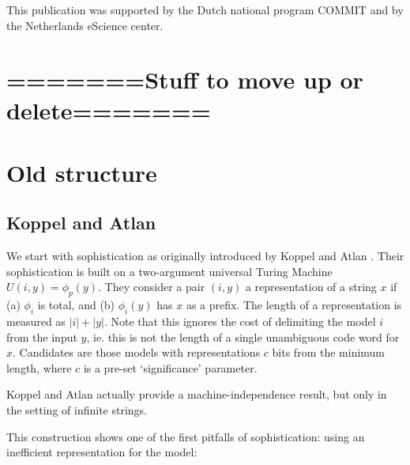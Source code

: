 \documentclass{style/llncs}
\begin{document}
\subsubsection*{\ackname}

This publication was supported by the Dutch national program COMMIT and by  the Netherlands eScience center.




\appendix

\section{=======Stuff to move up or delete=======}

\section{Old structure}


\subsection{Koppel and Atlan}

We start with sophistication as originally introduced by Koppel and Atlan \cite{koppelSoph1988,koppel1991almost}. Their sophistication is built on a two-argument universal Turing Machine $U(i, y) = \phi_p(y)$. They consider a pair $(i, y)$ a representation of a string $x$ if (a) $\phi_i$ is total, and (b) $\phi_i(y)$ has $x$ as a prefix. The length of a representation is measured as $|i| + |y|$. Note that this ignores the cost of delimiting the model $i$ from the input $y$, ie. this is not the length of a single unambiguous code word for $x$. Candidates are those models with representations $c$ bits from the minimum length, where $c$ is a pre-set `significance' parameter. 

\footnotemark 

Koppel and Atlan actually provide a machine-independence result, but only in the setting of infinite strings. 


This construction shows one of the first pitfalls of sophistication: using an inefficient representation for the model:
\end{document}
